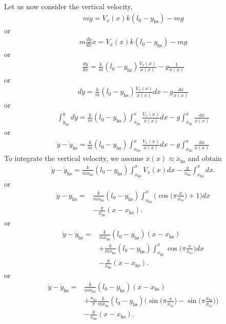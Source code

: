 \documentclass[journal,12pt,onecolumn]{IEEEtran}
\begin{document}
Let us now consider the vertical velocity,
\begin{align}
	m\ddot{y} = V_x(x) k (l_0-y_\text{hs}) - mg
\end{align}
or
\begin{align}
	m\frac{d\dot{y}}{dx} \dot x = V_x(x) k (l_0-y_\text{hs}) - mg
\end{align}
or
\begin{align}
	\frac{d\dot{y}}{dx} = \frac{k}{m} (l_0-y_\text{hs}) \frac{V_x(x)}{\dot x(x)} - g\frac{1}{\dot x(x)}
\end{align}
or
\begin{align}
	d\dot{y} = \frac{k}{m} (l_0-y_\text{hs}) \frac{V_x(x)}{\dot x(x)} dx - g\frac{dx}{\dot x(x)}
\end{align}
or
\begin{align}
\int_{\dot{y}_{\text{hs}}}^{\dot{y}}	d\dot{y} = \frac{k}{m} (l_0-y_\text{hs}) \int_{x_{\text{hs}}}^x\frac{V_x(x)}{\dot x(x)} dx - g \int_{x_{\text{hs}}}^x \frac{dx}{\dot x(x)}
\end{align}
or
\begin{align}
	\dot{y}-\dot{y}_{\text{hs}}= \frac{k}{m} (l_0-y_\text{hs}) \int_{x_{\text{hs}}}^x\frac{V_x(x)}{\dot x(x)} dx - g \int_{x_{\text{hs}}}^x \frac{dx}{\dot x(x)}
\end{align}
To integrate the vertical velocity, we assume $\dot{x}(x) \approx \dot{x}_{\text{hs}} $ and obtain
\begin{align}
	\dot{y}-\dot{y}_{\text{hs}}= \frac{k}{m \dot{x}_{\text{hs}}} (l_0-y_\text{hs}) \int_{x_{\text{hs}}}^xV_x(x) dx - \frac{g}{\dot{x}_{\text{hs}}} \int_{x_{\text{hs}}}^x dx.
\end{align}
or
\begin{align}\nonumber
	\dot{y}-\dot{y}_{\text{hs}}= & \frac{k}{m \dot{x}_{\text{hs}}} (l_0-y_\text{hs}) \int_{x_{\text{hs}}}^x \Big(\cos \Big(\pi\frac{x}{x_\text{to}} \Big)+ 1 \Big) dx \\
	&- \frac{g}{\dot{x}_{\text{hs}}} (x-x_{\text{hs}}).
\end{align}
or
\begin{align}\nonumber
	\dot{y}-\dot{y}_{\text{hs}}= & \frac{k}{m \dot{x}_{\text{hs}}} (l_0-y_\text{hs}) (x-x_{\text{hs}}) \\ \nonumber
	&+\frac{k}{m \dot{x}_{\text{hs}}} (l_0-y_\text{hs}) \int_{x_{\text{hs}}}^x \cos \Big(\pi\frac{x}{x_\text{to}} \Big) dx\\
	&-\frac{g}{\dot{x}_{\text{hs}}} (x-x_{\text{hs}}).
\end{align}
or
\begin{align}\nonumber
	\dot{y}-\dot{y}_{\text{hs}}= & \frac{k}{m \dot{x}_{\text{hs}}} (l_0-y_\text{hs}) (x-x_{\text{hs}}) \\ \nonumber
	&+\frac{x_{\text{to}}}{\pi} \frac{k}{m \dot{x}_{\text{hs}}} (l_0-y_\text{hs}) \Big(\sin \Big(\pi\frac{x}{x_\text{to}}\Big) - \sin \Big(\pi\frac{x_\text{hs}}{x_\text{to}} \Big) \Big)\\
	&-\frac{g}{\dot{x}_{\text{hs}}} (x-x_{\text{hs}}).
\end{align}
\end{document}
